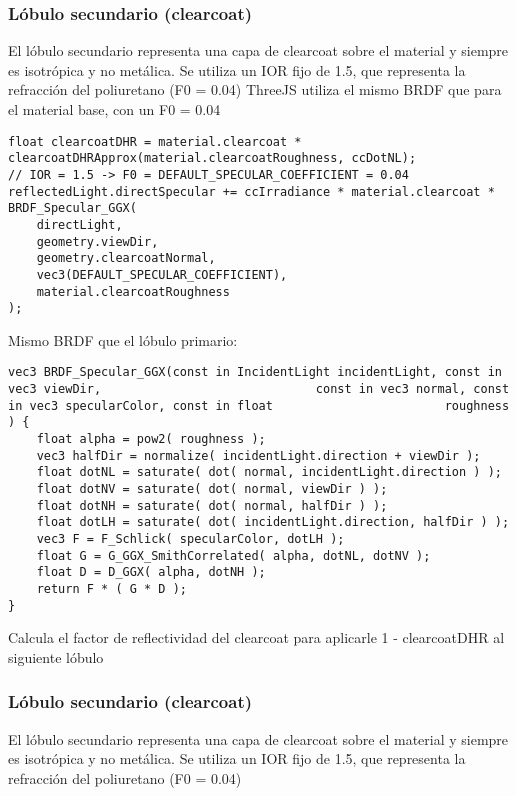         \subsubsection{L\'obulo secundario (clearcoat)}
            El l\'obulo secundario representa una capa de clearcoat sobre el material y siempre es isotr\'opica
            y no met\'alica. Se utiliza un IOR fijo de 1.5, que representa la refracci\'on del poliuretano (F0 = 0.04)
            ThreeJS utiliza el mismo BRDF que para el material base, con un F0 = 0.04
            \singlespacing
            \begin{lstlisting}[caption=My Javascript Example]
float clearcoatDHR = material.clearcoat * clearcoatDHRApprox(material.clearcoatRoughness, ccDotNL);
// IOR = 1.5 -> F0 = DEFAULT_SPECULAR_COEFFICIENT = 0.04
reflectedLight.directSpecular += ccIrradiance * material.clearcoat * BRDF_Specular_GGX(
    directLight,
    geometry.viewDir,
    geometry.clearcoatNormal,
    vec3(DEFAULT_SPECULAR_COEFFICIENT),
    material.clearcoatRoughness
);
            \end{lstlisting}
            \singlespacing
            Mismo BRDF que el l\'obulo primario:
            \singlespacing
            \begin{lstlisting}[caption=My Javascript Example]
vec3 BRDF_Specular_GGX(const in IncidentLight incidentLight, const in vec3 viewDir,                              const in vec3 normal, const in vec3 specularColor, const in float                        roughness ) {
    float alpha = pow2( roughness );
    vec3 halfDir = normalize( incidentLight.direction + viewDir );
    float dotNL = saturate( dot( normal, incidentLight.direction ) );
    float dotNV = saturate( dot( normal, viewDir ) );
    float dotNH = saturate( dot( normal, halfDir ) );
    float dotLH = saturate( dot( incidentLight.direction, halfDir ) );
    vec3 F = F_Schlick( specularColor, dotLH );
    float G = G_GGX_SmithCorrelated( alpha, dotNL, dotNV );
    float D = D_GGX( alpha, dotNH );
    return F * ( G * D );
}
            \end{lstlisting}
            \singlespacing
            Calcula el factor de reflectividad del clearcoat para aplicarle
            1 - clearcoatDHR al siguiente l\'obulo

        \subsubsection{L\'obulo secundario (clearcoat)}
            El l\'obulo secundario representa una capa de clearcoat sobre el material y
            siempre es isotr\'opica y no met\'alica.
            Se utiliza un IOR fijo de 1.5, que representa la refracci\'on del poliuretano (F0 = 0.04)
        
